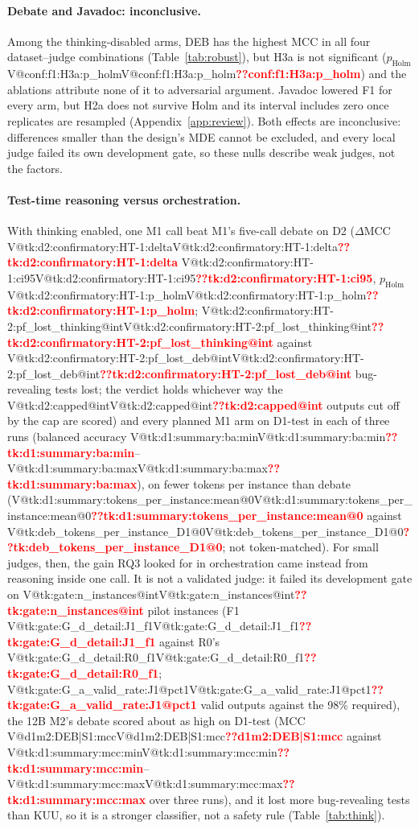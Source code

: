 \documentclass[pdflatex,iicol,sn-mathphys-num]{sn-jnl}
\makeatletter
\newcommand{\V}[1]{\ifcsname V@#1\endcsname\csname V@#1\endcsname\else\textbf{\textcolor{red}{??#1}}\fi}
\makeatother
\begin{document}
\paragraph{Debate and Javadoc: inconclusive.} Among the thinking-disabled arms, DEB has the highest MCC in all four dataset--judge combinations (Table~\ref{tab:robust}), but H3a is not significant ($p_\mathrm{Holm}$ \V{conf:f1:H3a:p_holm}) and the ablations attribute none of it to adversarial argument. Javadoc lowered F1 for every arm, but H2a does not survive Holm and its interval includes zero once replicates are resampled (Appendix~\ref{app:review}). Both effects are inconclusive: differences smaller than the design's MDE cannot be excluded, and every local judge failed its own development gate, so these nulls describe weak judges, not the factors.

\paragraph{Test-time reasoning versus orchestration.} With thinking enabled, one M1 call beat M1's five-call debate on D2 ($\Delta$MCC \V{tk:d2:confirmatory:HT-1:delta} \V{tk:d2:confirmatory:HT-1:ci95}, $p_\mathrm{Holm}$ \V{tk:d2:confirmatory:HT-1:p_holm}; \V{tk:d2:confirmatory:HT-2:pf_lost_thinking@int} against \V{tk:d2:confirmatory:HT-2:pf_lost_deb@int} bug-revealing tests lost; the verdict holds whichever way the \V{tk:d2:capped@int} outputs cut off by the cap are scored) and every planned M1 arm on D1-test in each of three runs (balanced accuracy \V{tk:d1:summary:ba:min}--\V{tk:d1:summary:ba:max}), on fewer tokens per instance than debate (\V{tk:d1:summary:tokens_per_instance:mean@0} against \V{tk:deb_tokens_per_instance_D1@0}; not token-matched). For small judges, then, the gain RQ3 looked for in orchestration came instead from reasoning inside one call. It is not a validated judge: it failed its development gate on \V{tk:gate:n_instances@int} pilot instances (F1 \V{tk:gate:G_d_detail:J1_f1} against R0's \V{tk:gate:G_d_detail:R0_f1}; \V{tk:gate:G_a_valid_rate:J1@pct1} valid outputs against the 98\% required), the 12B M2's debate scored about as high on D1-test (MCC \V{d1m2:DEB|S1:mcc} against \V{tk:d1:summary:mcc:min}--\V{tk:d1:summary:mcc:max} over three runs), and it lost more bug-revealing tests than KUU, so it is a stronger classifier, not a safety rule (Table~\ref{tab:think}).
\end{document}
